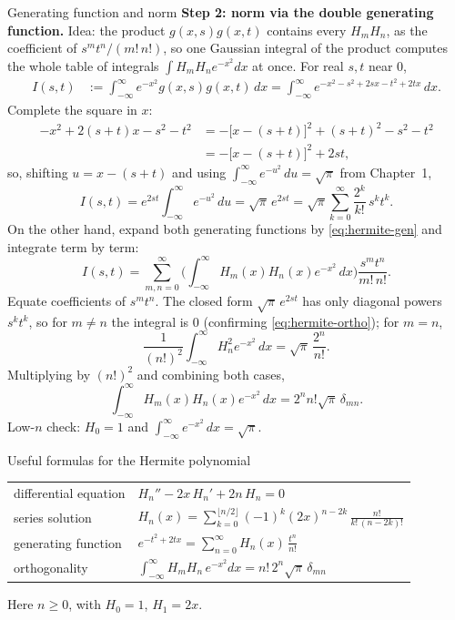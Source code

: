 \documentclass[11pt]{beamer}
\begin{document}
\begin{frame}[allowframebreaks=1.00]{Generating function and norm}
\textbf{Step 2: norm via the double generating function.}
Idea: the product $g(x,s)g(x,t)$ contains every $H_mH_n$, as the coefficient of
$s^mt^n/(m!\,n!)$, so one Gaussian integral of the product computes the whole table of
integrals $\int H_mH_ne^{-x^2}dx$ at once. For real $s,t$ near $0$,
\begin{align*}
  I(s,t)
  &:=\int_{-\infty}^{\infty}e^{-x^2}g(x,s)g(x,t)\,dx
   =\int_{-\infty}^{\infty}
    e^{-x^2-s^2+2sx-t^2+2tx}\,dx.
\end{align*}
Complete the square in $x$:
\begin{align*}
  -x^2+2(s+t)x-s^2-t^2
  &=-\bigl[x-(s+t)\bigr]^2+(s+t)^2-s^2-t^2\\
  &=-\bigl[x-(s+t)\bigr]^2+2st,
\end{align*}
so, shifting $u=x-(s+t)$ and using $\int_{-\infty}^{\infty}e^{-u^2}\,du=\sqrt\pi$ from Chapter~1,
\[
  I(s,t)=e^{2st}\int_{-\infty}^{\infty}e^{-u^2}\,du
  =\sqrt\pi\,e^{2st}
  =\sqrt\pi\sum_{k=0}^{\infty}\frac{2^k}{k!}\,s^k t^k.
\]
On the other hand, expand both generating functions by \eqref{eq:hermite-gen} and integrate
term by term:
\[
  I(s,t)
  =\sum_{m,n=0}^{\infty}
    \Biggl(
      \int_{-\infty}^{\infty}H_m(x)H_n(x)e^{-x^2}\,dx
    \Biggr)
    \frac{s^m t^n}{m!\,n!}.
\]
Equate coefficients of $s^mt^n$. The closed form $\sqrt\pi\,e^{2st}$ has only diagonal powers
$s^kt^k$, so for $m\ne n$ the integral is $0$ (confirming \eqref{eq:hermite-ortho}); for $m=n$,
\[
  \frac{1}{(n!)^2}\int_{-\infty}^{\infty}H_n^2 e^{-x^2}\,dx=\sqrt\pi\,\frac{2^n}{n!}.
\]
Multiplying by $(n!)^2$ and combining both cases,
\begin{equation}
  \int_{-\infty}^{\infty}H_m(x)H_n(x)e^{-x^2}\,dx
  =2^n n!\sqrt\pi\,\delta_{mn}.
  \label{eq:hermite-norm}
\end{equation}
Low-$n$ check: $H_0=1$ and $\int_{-\infty}^{\infty}e^{-x^2}\,dx=\sqrt\pi$.
\end{frame}

\begin{frame}{Useful formulas for the Hermite polynomial}
\footnotesize
\begin{center}
\renewcommand{\arraystretch}{1.55}
\begin{tabular}{ll}
differential equation
  & $H_n'' - 2x\,H_n' + 2n\,H_n = 0$ \\
series solution
  & $H_n(x)=\displaystyle\sum_{k=0}^{\lfloor n/2\rfloor}
       (-1)^k(2x)^{n-2k}\,\frac{n!}{k!\,(n-2k)!}$ \\
generating function
  & $e^{-t^2+2tx} = \displaystyle\sum_{n=0}^{\infty}H_n(x)\,\frac{t^n}{n!}$ \\
orthogonality
  & $\displaystyle\int_{-\infty}^{\infty}H_mH_n\,e^{-x^2}dx
       = n!\,2^n\sqrt{\pi}\,\delta_{mn}$
\end{tabular}
\end{center}
Here $n\ge0$, with $H_0=1$, $H_1=2x$.
\end{frame}
\end{document}
